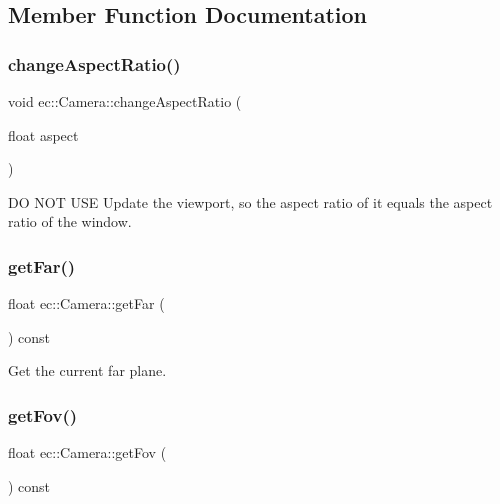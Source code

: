 \subsection{Member Function Documentation}
\mbox{\label{classec_1_1_camera_ae66d4600de35284b8c6846e3dbd9c12d}} 
\subsubsection{\texorpdfstring{change\+Aspect\+Ratio()}{changeAspectRatio()}}
{\footnotesize\ttfamily void ec\+::\+Camera\+::change\+Aspect\+Ratio (\begin{DoxyParamCaption}\item[{float}]{aspect }\end{DoxyParamCaption})}

DO N\+OT U\+SE Update the viewport, so the aspect ratio of it equals the aspect ratio of the window. \mbox{\label{classec_1_1_camera_a6555d47e1c17caf67cf8683b4cbaca4b}} 
\subsubsection{\texorpdfstring{get\+Far()}{getFar()}}
{\footnotesize\ttfamily float ec\+::\+Camera\+::get\+Far (\begin{DoxyParamCaption}{ }\end{DoxyParamCaption}) const}



Get the current far plane. 

\mbox{\label{classec_1_1_camera_a741cb88974dfd00492315ccf613e8539}} 
\subsubsection{\texorpdfstring{get\+Fov()}{getFov()}}
{\footnotesize\ttfamily float ec\+::\+Camera\+::get\+Fov (\begin{DoxyParamCaption}{ }\end{DoxyParamCaption}) const}



